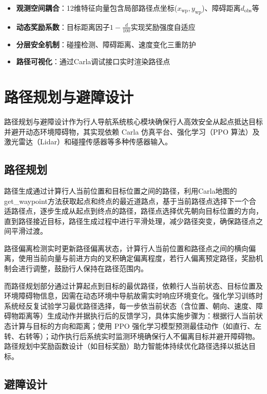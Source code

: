 \begin{itemize}
    \item \textbf{观测空间耦合}：12维特征向量包含局部路径点坐标($x_{\text{wp}}, y_{\text{wp}}$)、障碍距离$d_{\text{obs}}$等
    \item \textbf{动态奖励系数}：目标距离因子$1 - \frac{d}{100}$实现奖励强度自适应
    \item \textbf{分层安全机制}：碰撞检测、障碍距离、速度变化三重防护
    \item \textbf{路径可视化}：通过Carla调试接口实时渲染路径点
\end{itemize}

\section{路径规划与避障设计}

路径规划与避障设计作为行人导航系统核心模块确保行人高效安全从起点抵达目标并避开动态环境障碍物，其实现依赖 Carla 仿真平台、强化学习（PPO 算法）及激光雷达（Lidar）和碰撞传感器等多种传感器输入。

\subsection{路径规划}

路径生成通过计算行人当前位置和目标位置之间的路径，利用Carla地图的get\_waypoint方法获取起点和终点的最近道路点，基于当前路径点选择下一个合适路径点，逐步生成从起点到终点的路径，路径点选择优先朝向目标位置的方向，直到路径接近目标，路径生成过程中进行平滑处理，减少路径突变，确保路径点之间平滑过渡。

路径偏离检测实时更新路径偏离状态，计算行人当前位置和路径点之间的横向偏离，使用当前向量与前进方向的叉积确定偏离程度，若行人偏离预定路径，奖励机制会进行调整，鼓励行人保持在路径范围内。

而路径规划部分通过计算起点到目标的最优路径，依赖行人当前状态、目标位置及环境障碍物信息，因需在动态环境中导航故需实时响应环境变化。强化学习训练时系统经反复试验学习最优路径选择，每一步依当前状态（含位置、朝向、速度、障碍物距离等）生成动作并据执行后的反馈学习，具体实施步骤为：根据行人当前状态计算与目标的方向和距离；使用 PPO 强化学习模型预测最佳动作（如直行、左转、右转等）；动作执行后系统实时监测环境确保行人不偏离目标并避开障碍物。路径规划中奖励函数设计（如目标奖励）助力智能体持续优化路径选择以抵达目标。

\subsection{避障设计}

